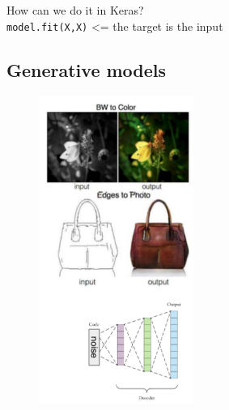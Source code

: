 How can we do it in Keras?\\
\texttt{model.fit(X,X)} <= the target is the input

\subsection{Generative models}
\begin{figure}
	\includegraphics[width=0.45\textwidth]{figure_ml/generative_models.png}
\end{figure} 
\quad
